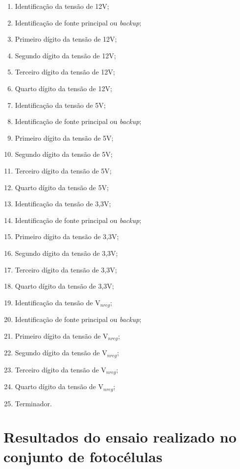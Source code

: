 \documentclass[
	12pt,				%
	openright,			%
	oneside,			%
	a4paper,			%
	english,			%
	french,				%
	spanish,			%
	brazil,				%
	oldfontcommands
	]{abntex2}
\begin{document}
\begin{apendicesenv}
	\begin{enumerate}
		\item Identificação da tensão de 12V;
		\item Identificação de fonte principal ou \textit{backup};
		\item Primeiro dígito da tensão de 12V;
		\item Segundo dígito da tensão de 12V;
		\item Terceiro dígito da tensão de 12V;
		\item Quarto dígito da tensão de 12V;
		\item Identificação da tensão de 5V;
		\item Identificação de fonte principal ou \textit{backup};
		\item Primeiro dígito da tensão de 5V;
		\item Segundo dígito da tensão de 5V;
		\item Terceiro dígito da tensão de 5V;
		\item Quarto dígito da tensão de 5V;
		\item Identificação da tensão de 3,3V;
		\item Identificação de fonte principal ou \textit{backup};
		\item Primeiro dígito da tensão de 3,3V;
		\item Segundo dígito da tensão de 3,3V;
		\item Terceiro dígito da tensão de 3,3V;
		\item Quarto dígito da tensão de 3,3V;
		\item Identificação da tensão de V$ _{nreg} $;
		\item Identificação de fonte principal ou \textit{backup};
		\item Primeiro dígito da tensão de V$ _{nreg} $;
		\item Segundo dígito da tensão de V$ _{nreg} $;
		\item Terceiro dígito da tensão de V$ _{nreg} $;
		\item Quarto dígito da tensão de V$ _{nreg} $;
		\item Terminador.
	\end{enumerate}
	
\chapter[Resultados do ensaio realizado no conjunto de fotocélulas]{Resultados do ensaio realizado no conjunto de fotocélulas}\label{An_cell4}


\end{apendicesenv}
\end{document}
